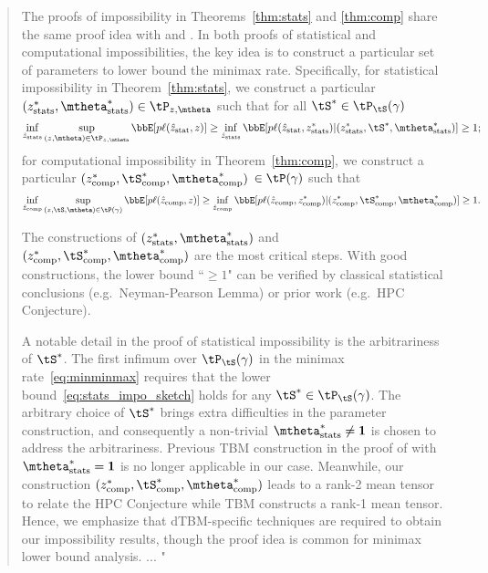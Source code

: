 \documentclass[11pt]{article}
\theoremstyle{definition}
\theoremstyle{definition}
\begin{document}
\begin{enumerate}
\begin{enumerate}[wide]
\begin{quote}
    The proofs of impossibility in Theorems~\ref{thm:stats} and \ref{thm:comp} share the same proof idea with \citet[Theorems 6 and 7]{han2020exact} and \citet[Theorem 2]{gao2018community}. In both proofs of statistical and computational impossibilities, the key idea is to construct a particular set of parameters to lower bound the minimax rate. Specifically, for statistical impossibility in Theorem~\ref{thm:stats}, we construct a particular $(z^*_{\rm stats}, \mtheta^*_{\rm stats})  \in \tP_{z, \mtheta} $ such that for all $\tS^* \in \tP_{\tS}(\gamma)$
\begin{equation}
    \inf_{\hat z_{\rm stats}} \sup_{(z, \mtheta) \in \tP_{z, \mtheta}} \bbE[p \ell(\hat z_{\rm stat}, z)] \geq \inf_{\hat z_{\rm stats}} \bbE[p \ell(\hat z_{\rm stat}, z_{\rm stats}^*)| (z^*_{\rm stats}, \tS^*,\mtheta^*_{\rm stats})] \geq 1;
\end{equation}
for computational impossibility in Theorem~\ref{thm:comp}, we construct a particular $(z^*_{\rm comp}, \tS^*_{\rm comp}, \mtheta^*_{\rm comp})$ $\in \tP(\gamma)$ such that 
\begin{equation}
    \inf_{\hat z_{\rm comp}} \sup_{(z, \tS, \mtheta) \in \tP(\gamma)} \bbE[p \ell(\hat z_{\rm comp}, z)] \geq \inf_{\hat z_{\rm comp}} \bbE[p \ell(\hat z_{\rm comp}, z_{\rm comp}^*)| (z^*_{\rm comp}, \tS^*_{\rm comp},\mtheta^*_{\rm comp})] \geq 1.
\end{equation}

The constructions of $(z^*_{\rm stats}, \mtheta^*_{\rm stats})$ and $(z^*_{\rm comp}, \tS^*_{\rm comp}, \mtheta^*_{\rm comp})$ are the most critical steps. With good constructions, the lower bound ``$\geq 1$" can be verified by classical statistical conclusions (e.g.\ Neyman-Pearson Lemma) or prior work (e.g.\ HPC Conjecture). 

A notable detail in the proof of statistical impossibility is the arbitrariness of $\tS^*$. The first infimum over $ \tP_{\tS}(\gamma)$ in the minimax rate~\eqref{eq:minminmax} requires that the lower bound~\eqref{eq:stats_impo_sketch} holds for any $\tS^* \in \tP_{\tS}(\gamma)$. The arbitrary choice of $\tS^*$ brings extra difficulties in the parameter construction, and consequently a non-trivial $\mtheta^*_{\rm stats} \neq \mathbf{1}$ is chosen to address the arbitrariness. Previous TBM construction in the proof of \citet[Theorem 6]{han2020exact} with $\mtheta^*_{\rm stats} = \mathbf{1}$ is no longer applicable in our case. Meanwhile, our construction $(z^*_{\rm comp}, \tS^*_{\rm comp}, \mtheta^*_{\rm comp})$ leads to a rank-2 mean tensor to relate the HPC Conjecture while TBM \citet[Theorem 7]{han2020exact} constructs a rank-1 mean tensor. Hence, we emphasize that dTBM-specific techniques are required to obtain our impossibility results, though the proof idea is common for minimax lower bound analysis. ... "
    \end{quote}
    

\end{enumerate}
\end{enumerate}
\end{document}
